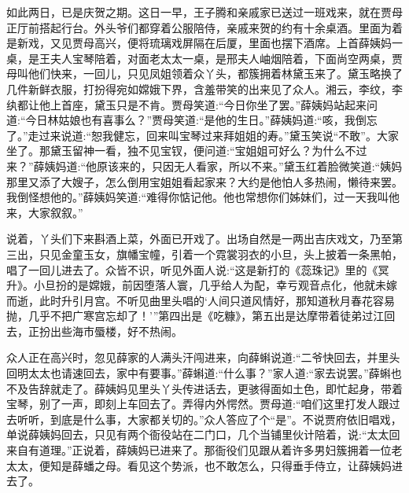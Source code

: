 \begin{parag}
    如此两日，已是庆贺之期。这日一早，王子腾和亲戚家已送过一班戏来，就在贾母正厅前搭起行台。外头爷们都穿着公服陪侍，亲戚来贺的约有十余桌酒。里面为着是新戏，又见贾母高兴，便将琉璃戏屏隔在后厦，里面也摆下酒席。上首薛姨妈一桌，是王夫人宝琴陪着，对面老太太一桌，是邢夫人岫烟陪着，下面尚空两桌，贾母叫他们快来，一回儿，只见凤姐领着众丫头，都簇拥着林黛玉来了。黛玉略换了几件新鲜衣服，打扮得宛如嫦娥下界，含羞带笑的出来见了众人。湘云，李纹，李纨都让他上首座，黛玉只是不肯。贾母笑道:“今日你坐了罢。”薛姨妈站起来问道:“今日林姑娘也有喜事么？”贾母笑道:“是他的生日。”薛姨妈道:“咳，我倒忘了。”走过来说道:“恕我健忘，回来叫宝琴过来拜姐姐的寿。”黛玉笑说“不敢”。大家坐了。那黛玉留神一看，独不见宝钗，便问道:“宝姐姐可好么？为什么不过来？”薛姨妈道:“他原该来的，只因无人看家，所以不来。”黛玉红着脸微笑道:“姨妈那里又添了大嫂子，怎么倒用宝姐姐看起家来？大约是他怕人多热闹，懒待来罢。我倒怪想他的。”薛姨妈笑道:“难得你惦记他。他也常想你们姊妹们，过一天我叫他来，大家叙叙。”
\end{parag}


\begin{parag}
    说着，丫头们下来斟酒上菜，外面已开戏了。出场自然是一两出吉庆戏文，乃至第三出，只见金童玉女，旗幡宝幢，引着一个霓裳羽衣的小旦，头上披着一条黑帕，唱了一回儿进去了。众皆不识，听见外面人说:“这是新打的《蕊珠记》里的《冥升》。小旦扮的是嫦娥，前因堕落人寰，几乎给人为配，幸亏观音点化，他就未嫁而逝，此时升引月宫。不听见曲里头唱的‘人间只道风情好，那知道秋月春花容易抛，几乎不把广寒宫忘却了！’”第四出是《吃糠》，第五出是达摩带着徒弟过江回去，正扮出些海市蜃楼，好不热闹。
\end{parag}


\begin{parag}
    众人正在高兴时，忽见薛家的人满头汗闯进来，向薛蝌说道:“二爷快回去，并里头回明太太也请速回去，家中有要事。”薛蝌道:“什么事？”家人道:“家去说罢。”薛蝌也不及告辞就走了。薛姨妈见里头丫头传进话去，更骇得面如土色，即忙起身，带着宝琴，别了一声，即刻上车回去了。弄得内外愕然。贾母道:“咱们这里打发人跟过去听听，到底是什么事，大家都关切的。”众人答应了个“是”。不说贾府依旧唱戏，单说薛姨妈回去，只见有两个衙役站在二门口，几个当铺里伙计陪着，说:“太太回来自有道理。”正说着，薛姨妈已进来了。那衙役们见跟从着许多男妇簇拥着一位老太太，便知是薛蟠之母。看见这个势派，也不敢怎么，只得垂手侍立，让薛姨妈进去了。
\end{parag}


